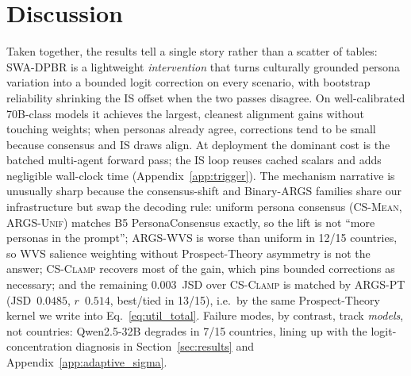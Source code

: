 \documentclass{article}
\begin{document}
\section{Discussion}
\label{sec:discussion}

Taken together, the results tell a single story rather than a scatter of
tables: SWA-DPBR is a lightweight \emph{intervention} that turns culturally
grounded persona variation into a bounded logit correction on every scenario,
with bootstrap reliability shrinking the IS offset when the two passes disagree.
On well-calibrated 70B-class models it achieves the largest, cleanest alignment
gains without touching weights; when personas already agree, corrections tend to
be small because consensus and IS draws align. At deployment the dominant cost is
the batched multi-agent forward pass; the IS loop reuses cached scalars and adds
negligible wall-clock time (Appendix~\ref{app:trigger}).
The mechanism narrative is unusually sharp because the consensus-shift and
Binary-ARGS families share our infrastructure but swap the decoding rule:
uniform persona consensus (\textsc{CS-Mean}, \textsc{ARGS-Unif}) matches B5
PersonaConsensus exactly, so the lift is not ``more personas in the prompt'';
\textsc{ARGS-WVS} is worse than uniform in 12/15 countries, so WVS salience
weighting without Prospect-Theory asymmetry is not the answer; \textsc{CS-Clamp}
recovers most of the gain, which pins bounded corrections as necessary; and the
remaining $0.003$~JSD over \textsc{CS-Clamp} is matched by \textsc{ARGS-PT}
(JSD~$0.0485$, $r$~$0.514$, best/tied in 13/15), i.e.\ by the same Prospect-Theory
kernel we write into Eq.~\ref{eq:util_total}.
Failure modes, by contrast, track \emph{models}, not countries: Qwen2.5-32B
degrades in 7/15 countries, lining up with the logit-concentration diagnosis in
Section~\ref{sec:results} and Appendix~\ref{app:adaptive_sigma}.
\end{document}
